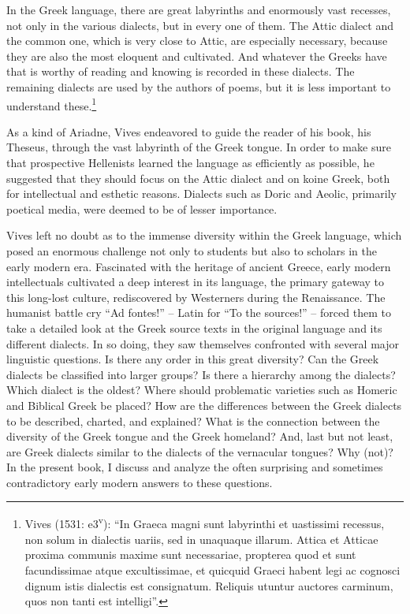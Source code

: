 \begin{styleQuote}
In the Greek language, there are great labyrinths and enormously vast recesses, not only in the various dialects, but in every one of them. The Attic dialect and the common one, which is very close to Attic, are especially necessary, because they are also the most eloquent and cultivated. And whatever the Greeks have that is worthy of reading and knowing is recorded in these dialects. The remaining dialects are used by the authors of poems, but it is less important to understand these.\footnote{ Vives (1531: e3\textsuperscript{v}): “In Graeca magni sunt labyrinthi et uastissimi recessus, non solum in dialectis uariis, sed in unaquaque illarum. Attica et Atticae proxima communis maxime sunt necessariae, propterea quod et sunt facundissimae atque excultissimae, et quicquid Graeci habent legi ac cognosci dignum istis dialectis est consignatum. Reliquis utuntur auctores carminum, quos non tanti est intelligi”.}
\end{styleQuote}

\begin{styleStandard}
As a kind of Ariadne, Vives endeavored to guide the reader of his book, his Theseus, through the vast labyrinth of the Greek tongue. In order to make sure that prospective Hellenists learned the language as efficiently as possible, he suggested that they should focus on the Attic dialect and on koine Greek, both for intellectual and esthetic reasons. Dialects such as Doric and Aeolic, primarily poetical media, were deemed to be of lesser importance.
\end{styleStandard}

\begin{styleStandard}
Vives left no doubt as to the immense diversity within the Greek language, which posed an enormous challenge not only to students but also to scholars in the early modern era. Fascinated with the heritage of ancient Greece, early modern intellectuals cultivated a deep interest in its language, the primary gateway to this long-lost culture, rediscovered by Westerners during the Renaissance. The humanist battle cry “Ad fontes!” – Latin for “To the sources!” – forced them to take a detailed look at the Greek source texts in the original language and its different dialects. In so doing, they saw themselves confronted with several major linguistic questions. Is there any order in this great diversity? Can the Greek dialects be classified into larger groups? Is there a hierarchy among the dialects? Which dialect is the oldest? Where should problematic varieties such as Homeric and Biblical Greek be placed? How are the differences between the Greek dialects to be described, charted, and explained? What is the connection between the diversity of the Greek tongue and the Greek homeland? And, last but not least, are Greek dialects similar to the dialects of the vernacular tongues? Why (not)? In the present book, I discuss and analyze the often surprising and sometimes contradictory early modern answers to these questions.
\end{styleStandard}

